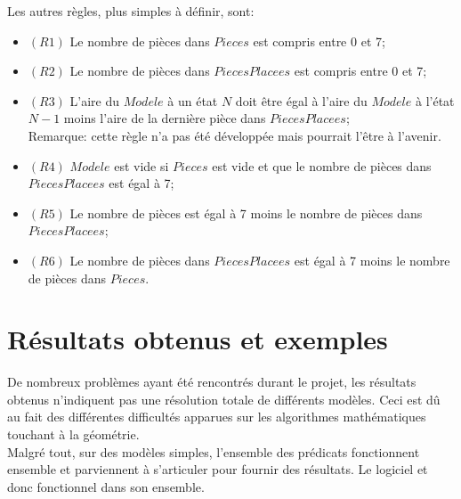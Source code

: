 \documentclass[a4paper, 11pt]{report}
\begin{document}
Les autres règles, plus simples à définir, sont:
	\begin{itemize}
		\item $(R1)$ Le nombre de pièces dans $Pieces$ est compris entre 0 et 7;
		\item $(R2)$ Le nombre de pièces dans $PiecesPlacees$ est compris entre 0 et 7;
		\item $(R3)$ L'aire du $Modele$ à un état $N$ doit être égal à l'aire du $Modele$ à l'état $N-1$ moins l'aire de la dernière pièce dans $PiecesPlacees$;\\
		Remarque: cette règle n'a pas été développée mais pourrait l'être à l'avenir.
		\item $(R4)$ $Modele$ est vide si $Pieces$ est vide et que le nombre de pièces dans $PiecesPlacees$
est égal à 7;
		\item $(R5)$ Le nombre de pièces est égal à 7 moins le nombre de pièces dans $PiecesPlacees$;
		\item $(R6)$ Le nombre de pièces dans $PiecesPlacees$ est égal à 7 moins le nombre de pièces dans $Pieces$.
	\end{itemize}
	
	\chapter{Résultats obtenus et exemples}
	
	De nombreux problèmes ayant été rencontrés durant le projet, les résultats obtenus n'indiquent pas une résolution totale de différents modèles. Ceci est d\^u au fait des différentes difficultés apparues sur les algorithmes mathématiques touchant à la géométrie.\\
	Malgré tout, sur des modèles simples, l'ensemble des prédicats fonctionnent ensemble et parviennent à s'articuler pour fournir des résultats. Le logiciel et donc fonctionnel dans son ensemble.\\ \ \\
	
\end{document}
